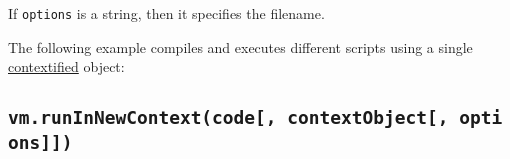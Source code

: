 If \texttt{options} is a string, then it specifies the filename.

The following example compiles and executes different scripts using a
single
\hyperref[what-does-it-mean-to-contextify-an-object]{contextified}
object:

\begin{Shaded}
\begin{Highlighting}[]
\OperatorTok{=} \NormalTok{(}\NormalTok{)}\OperatorTok{;}

\OperatorTok{=}\NormalTok{ \{ }\OperatorTok{:} \NormalTok{ \}}\OperatorTok{;}
\OperatorTok{;}

\NormalTok{ (}\OperatorTok{=} \OperatorTok{;}\OperatorTok{\textless{}} \OperatorTok{;} \OperatorTok{++}
\NormalTok{(}\OperatorTok{,}\OperatorTok{;}
\NormalTok{\}}
\OperatorTok{;}
\end{Highlighting}
\end{Shaded}

\subsection{\texorpdfstring{\texttt{vm.runInNewContext(code{[},\ contextObject{[},\ options{]}{]})}}{vm.runInNewContext(code{[}, contextObject{[}, options{]}{]})}}\label{vm.runinnewcontextcode-contextobject-options}

